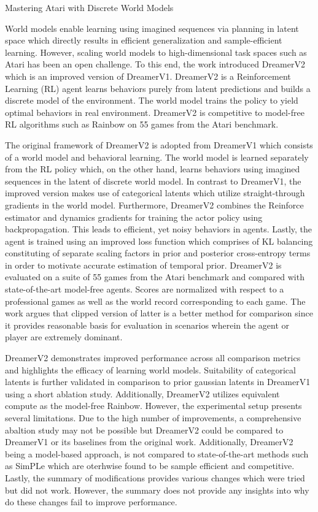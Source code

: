 \documentclass[11pt,letterpaper]{article}
\begin{document}
\begin{center}
  \large{Mastering Atari with Discrete World Models}
\end{center}
World models enable learning using imagined sequences via planning in latent space which directly results in efficient generalization and sample-efficient learning. However, scaling world models to high-dimensional task spaces such as Atari has been an open challenge. To this end, the work introduced DreamerV2 which is an improved version of DreamerV1. DreamerV2 is a Reinforcement Learning (RL) agent learns behaviors purely from latent predictions and builds a discrete model of the environment. The world model trains the policy to yield optimal behaviors in real environment. DreamerV2 is competitive to model-free RL algorithms such as Rainbow on 55 games from the Atari benchmark.

The original framework of DreamerV2 is adopted from DreamerV1 which consists of a world model and behavioral learning. The world model is learned separately from the RL policy which, on the other hand, learns behaviors using imagined sequences in the latent of discrete world model. In contrast to DreamerV1, the improved version makes use of categorical latents which utilize straight-through gradients in the world model. Furthermore, DreamerV2 combines the Reinforce estimator and dynamics gradients for training the actor policy using backpropagation. This leads to efficient, yet noisy behaviors in agents. Lastly, the agent is trained using an improved loss function which comprises of KL balancing constituting of separate scaling factors in prior and posterior cross-entropy terms in order to motivate accurate estimation of temporal prior. DreamerV2 is evaluated on a suite of 55 games from the Atari benchmark and compared with state-of-the-art model-free agents. Scores are normalized with respect to a professional games as well as the world record corresponding to each game. The work argues that clipped version of latter is a better method for comparison since it provides reasonable basis for evaluation in scenarios wherein the agent or player are extremely dominant.

DreamerV2 demonstrates improved performance across all comparison metrics and highlights the efficacy of learning world models. Suitability of categorical latents is further validated in comparison to prior gaussian latents in DreamerV1 using a short ablation study. Additionally, DreamerV2 utilizes equivalent compute as the model-free Rainbow. However, the experimental setup presents several limitations. Due to the high number of improvements, a comprehensive abaltion study may not be possible but DreamerV2 could be compared to DreamerV1 or its baselines from the original work. Additionally, DreamerV2 being a model-based approach, is not compared to state-of-the-art methods such as SimPLe which are oterhwise found to be sample efficient and competitive. Lastly, the summary of modifications provides various changes which were tried but did not work. However, the summary does not provide any insights into why do these changes fail to improve performance. 
\end{document}
